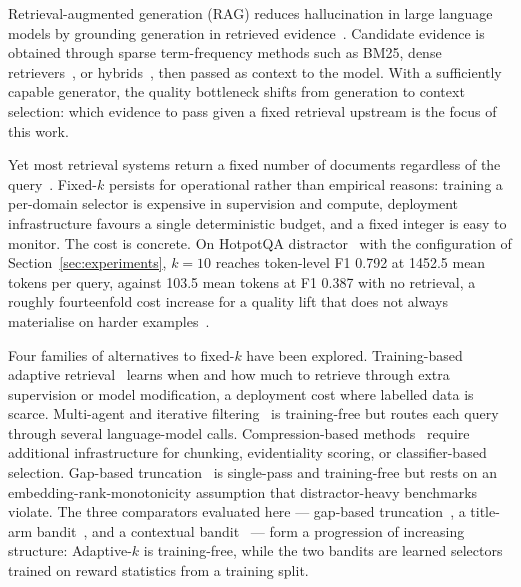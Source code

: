 \documentclass[runningheads]{llncs}
\begin{document}
Retrieval-augmented generation (RAG) reduces hallucination in large language models by grounding generation in retrieved evidence~\cite{lewis2020rag}. Candidate evidence is obtained through sparse term-frequency methods such as BM25, dense retrievers~\cite{karpukhin2020dpr}, or hybrids~\cite{zhao2026aigcsurvey}, then passed as context to the model. With a sufficiently capable generator, the quality bottleneck shifts from generation to context selection: which evidence to pass given a fixed retrieval upstream is the focus of this work.

Yet most retrieval systems return a fixed number of documents regardless of the query~\cite{klesel2025rag}. Fixed-$k$ persists for operational rather than empirical reasons: training a per-domain selector is expensive in supervision and compute, deployment infrastructure favours a single deterministic budget, and a fixed integer is easy to monitor. The cost is concrete. On HotpotQA distractor~\cite{yang2018hotpotqa} with the configuration of Section~\ref{sec:experiments}, $k{=}10$ reaches token-level F1 0.792 at 1452.5 mean tokens per query, against 103.5 mean tokens at F1 0.387 with no retrieval, a roughly fourteenfold cost increase for a quality lift that does not always materialise on harder examples~\cite{verma2026reflectiverag,li2025bestpractices}.

Four families of alternatives to fixed-$k$ have been explored. Training-based adaptive retrieval~\cite{asai2024selfrag,guo2025dior,su2024dragin} learns when and how much to retrieve through extra supervision or model modification, a deployment cost where labelled data is scarce. Multi-agent and iterative filtering~\cite{chang2024mainrag,nahid2025prism} is training-free but routes each query through several language-model calls. Compression-based methods~\cite{jeong2025ecorag,singh2025chunkrag,xiong2025drrag} require additional infrastructure for chunking, evidentiality scoring, or classifier-based selection. Gap-based truncation~\cite{taguchi2025adaptivek} is single-pass and training-free but rests on an embedding-rank-monotonicity assumption that distractor-heavy benchmarks violate. The three comparators evaluated here --- gap-based truncation~\cite{taguchi2025adaptivek}, a title-arm bandit~\cite{auer2002ucb1}, and a contextual bandit~\cite{chu2011linucb} --- form a progression of increasing structure: Adaptive-$k$ is training-free, while the two bandits are learned selectors trained on reward statistics from a training split.
\end{document}
